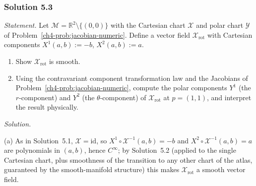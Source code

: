 \documentclass[11pt]{article}
\begin{document}
\subsubsection*{Solution 5.3}

\noindent\textit{Statement.} Let $\mathcal M=\mathbb R^2\setminus\{(0,0)\}$
with the Cartesian chart $\mathcal X$ and polar chart $\mathcal Y$ of
Problem~\ref{ch4-prob:jacobian-numeric}. Define a vector field $\mathcal
X_{\mathrm{rot}}$ with Cartesian components $X^1(a,b):=-b$,
$X^2(a,b):=a$.
\begin{enumerate}[label=(\alph*)]
  \item Show $\mathcal X_{\mathrm{rot}}$ is smooth.
  \item Using the contravariant component transformation law and the
  Jacobians of Problem~\ref{ch4-prob:jacobian-numeric}, compute the polar
  components $Y^1$ (the $r$-component) and $Y^2$ (the $\theta$-component)
  of $\mathcal X_{\mathrm{rot}}$ at $p=(1,1)$, and interpret the result
  physically.
\end{enumerate}

\medskip
\noindent\textit{Solution.}

(a) As in Solution~5.1, $\mathcal X=\mathrm{id}$, so $X^1\circ\mathcal
X^{-1}(a,b)=-b$ and $X^2\circ\mathcal X^{-1}(a,b)=a$ are polynomials in
$(a,b)$, hence $C^\infty$; by Solution~5.2 (applied to the single
Cartesian chart, plus smoothness of the transition to any other chart of
the atlas, guaranteed by the smooth-manifold structure) this makes
$\mathcal X_{\mathrm{rot}}$ a smooth vector field.
\end{document}
